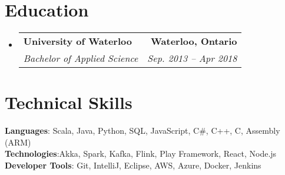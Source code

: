 \documentclass[letterpaper,11pt]{article}
\makeatletter
\newcommand{\resumeSubheading}[4]{
  \vspace{-3pt}\item
    \begin{tabular*}{0.97\textwidth}[t]{l@{\extracolsep{\fill}}r}
      \textbf{#1} & {\small \textbf{#2}} \\
      \textit{\fontsize{10}{11}\selectfont #3} & \textit{\fontsize{8}{10}\selectfont #4} \\  %
    \end{tabular*}\vspace{-1pt}
}
\newcommand{\resumeSubHeadingListStart}{\begin{itemize}[leftmargin=0.15in, label={}]}
\newcommand{\resumeSubHeadingListEnd}{\end{itemize}}
\makeatother
\begin{document}
\section{Education}
  \resumeSubHeadingListStart
    \resumeSubheading
      {University of Waterloo}{Waterloo, Ontario}
      {Bachelor of Applied Science}{Sep. 2013 -- Apr 2018}
  \resumeSubHeadingListEnd


%
\section{Technical Skills}
 \begin{itemize}[leftmargin=0.15in, label={}]
    \small{\item{
     \textbf{Languages}{: Scala, Java, Python, SQL, JavaScript, C\#, C++, C, Assembly (ARM)} \\
     \textbf{Technologies}{:Akka, Spark, Kafka, Flink, Play Framework, React, Node.js} \\
     \textbf{Developer Tools}{: Git, IntelliJ, Eclipse, AWS, Azure, Docker, Jenkins}
    }}
 \end{itemize}


\end{document}
